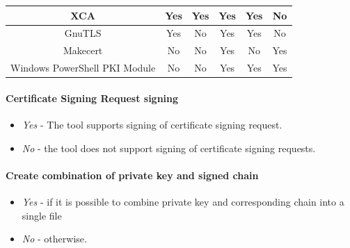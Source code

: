 \documentclass[10pt, a4paper]{report}
\begin{document}
\begin{table}[h!]
\begin{adjustbox}{max width=\textwidth}
\begin{tabular}{|c|c|c|c|c|c|}
XCA                           & \cellcolor[HTML]{34FF34}Yes   & \cellcolor[HTML]{34FF34}Yes              & \cellcolor[HTML]{34FF34}Yes                    & \cellcolor[HTML]{34FF34}Yes                & \cellcolor[HTML]{FE0000}No                                                  \\ \hline
GnuTLS                        & \cellcolor[HTML]{34FF34}Yes   & \cellcolor[HTML]{FE0000}No               & \cellcolor[HTML]{34FF34}Yes                    & \cellcolor[HTML]{34FF34}Yes                & \cellcolor[HTML]{FE0000}No                                                  \\ \hline
Makecert	              & \cellcolor[HTML]{FE0000}No    & \cellcolor[HTML]{FE0000}No	 	 & \cellcolor[HTML]{34FF34}Yes	               & \cellcolor[HTML]{FE0000}No                 & \cellcolor[HTML]{34FF34}Yes              		                          \\ \hline
Windows PowerShell PKI Module & \cellcolor[HTML]{FE0000}No    & \cellcolor[HTML]{FE0000}No	         & \cellcolor[HTML]{34FF34}Yes	               & \cellcolor[HTML]{34FF34}Yes	            & \cellcolor[HTML]{34FF34}Yes                                                 \\ \hline
\end{tabular}
\end{adjustbox}
\end{table}

\paragraph{Certificate Signing Request signing}

\begin{itemize}
\item \textit{Yes} - The tool supports signing of certificate signing request.
\item \textit{No} - the tool does not support signing of certificate signing requests.
\end{itemize}

\paragraph{Create combination of private key and signed chain}

\begin{itemize}
 \item \textit{Yes} - if it is possible to combine private key and corresponding chain into a single file
 \item \textit{No} - otherwise.
\end{itemize}
\end{document}
